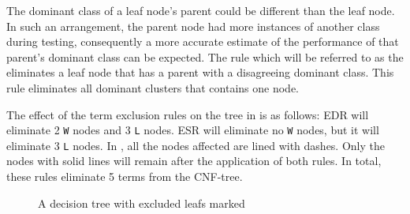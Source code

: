 \documentclass[twoside,11pt]{article}
\begin{document}
The dominant class of a leaf node's parent could be different than the leaf node.  In such an arrangement, the parent node had more instances of another class during testing, consequently a more accurate estimate of the performance of that parent's dominant class can be expected. The rule which will be referred to as the  eliminates a leaf node that has a parent with a disagreeing dominant class.  This rule eliminates all dominant clusters that contains one node.  

The effect of the term exclusion rules on the tree in  is as follows: EDR will eliminate 2 {\tt W} nodes and 3 {\tt L} nodes.  ESR will eliminate no {\tt W} nodes, but it will eliminate 3 {\tt L} nodes. In , all the nodes affected are lined with dashes.  Only the nodes with solid lines will remain after the application of both rules.  In total, these rules eliminate 5 terms from the CNF-tree.
\begin{figure} [htb]
\center
\tiny
{}
{
		{
				{
						{
								{
										
										{
												{
														{
																{
																		{
																				{
																						{
																						}
																				}
																		}
																}																
														}
												}
										}
								}
						}
				}
		}
}
\caption{A decision tree with excluded leafs marked}
\label{fig:dec_trimmed_tree}
\end{figure}
\end{document}
